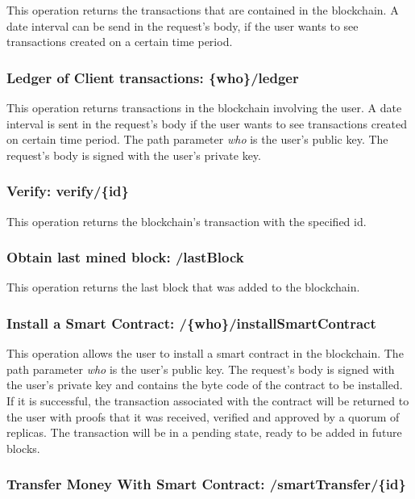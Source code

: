 \documentclass[10pt,journal,compsoc]{IEEEtran}
\begin{document}
	This operation returns the transactions that are contained in the blockchain. A date interval can be send in the request's body, if the user wants to see transactions created on a certain time period. 
	

	\subsubsection{Ledger of Client transactions: \textbf{\{who\}/ledger} }
	
	This operation returns transactions in the blockchain involving the user. A date interval is sent in the request's body if the user wants to see transactions created on certain time period. The path parameter \textit{who} is the user's public key. The request's body is signed with the user's private key.
	
	\subsubsection{Verify: \textbf{verify/\{id\}} }
	
	This operation returns the blockchain's transaction with the specified id. 
	
	\subsubsection{Obtain last mined block: \textbf{/lastBlock} }
	
	This operation returns the last block that was added to the blockchain.
	
	\subsubsection{Install a Smart Contract: \textbf{/\{who\}/installSmartContract} }
	
	This operation allows the user to install a smart contract in the blockchain. The path parameter \textit{who} is the user's public key. The request's body is signed with the user's private key and contains the byte code of the contract to be installed. If it is successful, the transaction associated with the contract will be returned to the user with proofs that it was received, verified and approved by a quorum of replicas. The transaction will be in a pending state, ready to be added in future blocks.
	
	\subsubsection{Transfer Money With Smart Contract: \textbf{/smartTransfer/\{id\}} }
	
\end{document}
